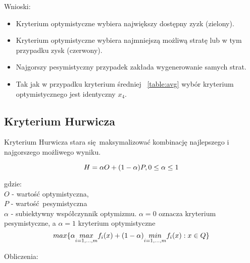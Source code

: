\documentclass{article}
\begin{document}
Wnioski:

\begin{itemize}
  \item Kryterium optymistyczne wybiera największy dostępny zyzk (zielony).
  \item Kryterium optymistyczne wybiera najmniejszą możliwą stratę lub w tym przypadku zysk (czerwony).
  \item Najgorszy pesymistyczny przypadek zakłada wygenerowanie samych strat.
  \item Tak jak w przypadku kryterium średniej ~\ref{table:avg} wybór kryterium optymistycznego jest identyczny $x_4$.
\end{itemize}

\subsection{Kryterium Hurwicza}

Kryterium Hurwicza stara się maksymalizować kombinację najlepszego i najgorszego możliwego wyniku.

\begin{equation}
    \centering
    H = \alpha O + (1 - \alpha) P, 0 \leq \alpha \leq 1
\end{equation}

gdzie: \\
$O$ - wartość optymistyczna, \\
$P$ - wartość pesymistyczna \\
$\alpha$ - subiektywny współczynnik optymizmu. $\alpha = 0$ oznacza kryterium pesymistyczne, a $\alpha = 1$ kryterium optymistyczne  \\

\begin{equation}
  \centering
    max \{ \alpha \underset{i=1,...,m}{max} f_i(x) + (1 - \alpha) \underset{i=1,...,m}{min} f_i(x) : x \in Q\}
\end{equation}

Obliczenia:
\end{document}
